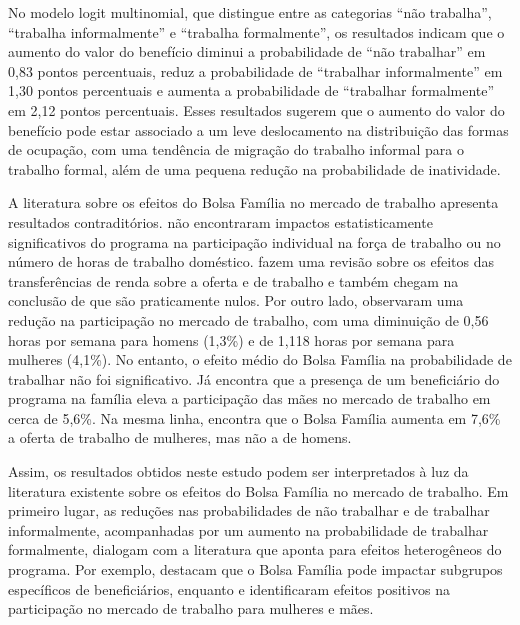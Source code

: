 \documentclass[12pt, a4paper, openany]{book}
\numberwithin{equation}{chapter}
\numberwithin{table}{chapter}
\numberwithin{figure}{chapter}
\theoremstyle{break}
\begin{document}
No modelo logit multinomial, que distingue entre as categorias ``não trabalha'', ``trabalha informalmente'' e ``trabalha formalmente'', os resultados indicam que o aumento do valor do benefício diminui a probabilidade de ``não trabalhar'' em 0,83 pontos percentuais, reduz a probabilidade de ``trabalhar informalmente'' em 1,30 pontos percentuais e aumenta a probabilidade de ``trabalhar formalmente'' em 2,12 pontos percentuais. Esses resultados sugerem que o aumento do valor do benefício pode estar associado a um leve deslocamento na distribuição das formas de ocupação, com uma tendência de migração do trabalho informal para o trabalho formal, além de uma pequena redução na probabilidade de inatividade.

A literatura sobre os efeitos do Bolsa Família no mercado de trabalho apresenta resultados contraditórios. \textcite{debrauw2015bolsa} não encontraram impactos estatisticamente significativos do programa na participação individual na força de trabalho ou no número de horas de trabalho doméstico. \textcite{oliveira2012se} fazem uma revisão sobre os efeitos das transferências de renda sobre a oferta e de trabalho e também chegam na conclusão de que são praticamente nulos. Por outro lado, \textcite{teixeira2010heterogeneity} observaram uma redução na participação no mercado de trabalho, com uma diminuição de 0,56 horas por semana para homens (1,3\%) e de 1,118 horas por semana para mulheres (4,1\%). No entanto, o efeito médio do Bolsa Família na probabilidade de trabalhar não foi significativo. Já \textcite{tavares2010efeito} encontra que a presença de um beneficiário do programa na família eleva a participação das mães no mercado de trabalho em cerca de 5,6\%. Na mesma linha, \textcite{mariante2024} encontra que o Bolsa Família aumenta em 7,6\% a oferta de trabalho de mulheres, mas não a de homens. 

Assim, os resultados obtidos neste estudo podem ser interpretados à luz da literatura existente sobre os efeitos do Bolsa Família no mercado de trabalho. Em primeiro lugar, as reduções nas probabilidades de não trabalhar e de trabalhar informalmente, acompanhadas por um aumento na probabilidade de trabalhar formalmente, dialogam com a literatura que aponta para efeitos heterogêneos do programa. Por exemplo, \textcite{teixeira2010heterogeneity} destacam que o Bolsa Família pode impactar subgrupos específicos de beneficiários, enquanto \textcite{tavares2010efeito} e \textcite{mariante2024} identificaram efeitos positivos na participação no mercado de trabalho para mulheres e mães.
\end{document}
